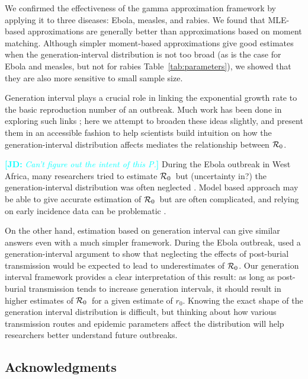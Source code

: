\documentclass[12pt,]{article}
\newcommand{\RR}{\ensuremath{{\cal R}}}
\newcommand{\Rx}[1]{\ensuremath{{\cal R}_{#1}}}
\newcommand{\Ro}{\Rx{0}}
\newcommand{\tref}[1]{Table~\ref{tab:#1}}
\newcommand{\comment}[3]{\textcolor{#1}{\textbf{[#2: }\textit{#3}\textbf{]}}}
\newcommand{\jd}[1]{\comment{cyan}{JD}{#1}}
\begin{document}
We confirmed the effectiveness of the gamma approximation framework by applying it to three diseases: Ebola, measles, and rabies. 
We found that MLE-based approximations are generally better than approximations based on moment matching. Although simpler moment-based approximations give good estimates when the generation-interval distribution is not too broad (as is the case for Ebola and measles, but not for rabies \tref{parameters}), we showed that they are also more sensitive to small sample size.


Generation interval plays a crucial role in linking the exponential growth rate to the basic reproduction number of an outbreak.
Much work has been done in exploring such links \cite{WallLips07,Sven07,Sven15,Nish10};
here we attempt to broaden these ideas slightly, and present them in an accessible fashion to help scientists build intuition on how the generation-interval distribution affects mediates the relationship between \Ro.

\jd{Can't figure out the intent of this P.}
During the Ebola outbreak in West Africa, many researchers tried to estimate \Ro\ but (uncertainty in?) the generation-interval distribution was often neglected \cite{Alth14, OtherFastResponders}.
Model based approach may be able to give accurate estimation of \Ro\ but are often complicated, and relying on early incidence data can be problematic \cite{TaylDush16}.

On the other hand, estimation based on generation interval can give similar answers even with a much simpler framework.
During the Ebola outbreak, \cite{WeitDush15} used a generation-interval argument to  show that neglecting the effects of post-burial transmission would be expected to lead to underestimates of \Ro.
Our generation interval framework provides a clear interpretation of this result: as long as post-burial transmission tends to increase generation intervals, it should result in higher estimates of \Ro\ for a given estimate of $r_0$.
Knowing the exact shape of the generation interval distribution is difficult, but thinking about how various transmission routes and epidemic parameters affect the distribution will help researchers better understand future outbreaks.

\subsection*{Acknowledgments}

\printbibliography
\end{document}
